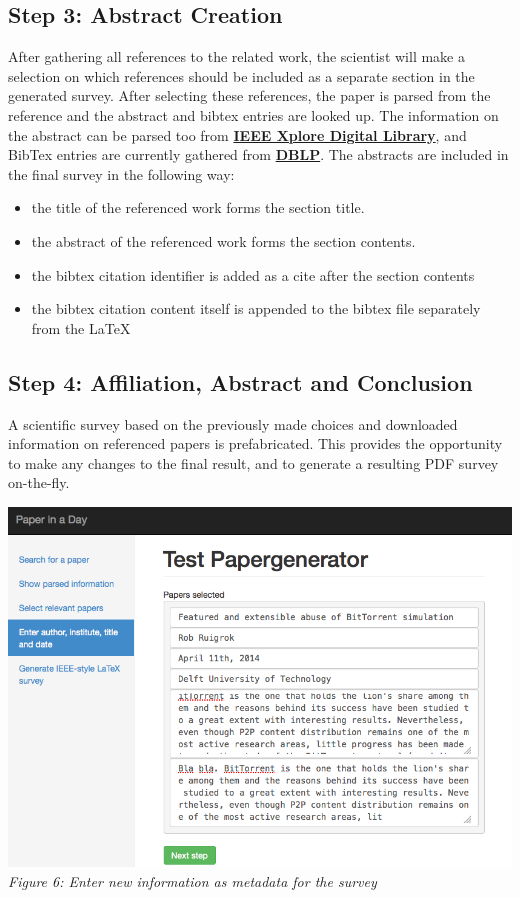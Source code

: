 \documentclass[12pt]{article}
\begin{document}
\subsection{Step 3: Abstract Creation}
After gathering all references to the related work, the scientist will make a selection on which references should be included as a separate section in the generated survey. After selecting these references, the paper is parsed from the reference and the abstract and bibtex entries are looked up. The information on the abstract can be parsed too from \textbf{\href{http://ieeexplore.ieee.org/Xplore/home.jsp}{IEEE Xplore Digital Library}}, and BibTex entries are currently gathered from \textbf{\href{http://dblp.uni-trier.de/db/}{DBLP}}. The abstracts are included in the final survey in the following way:
\begin{itemize}
\item the title of the referenced work forms the section title.
\item the abstract of the referenced work forms the section contents.
\item the bibtex citation identifier is added as a cite after the section contents
\item the bibtex citation content itself is appended to the bibtex file separately from the LaTeX
\end{itemize}

\subsection{Step 4: Affiliation, Abstract and Conclusion}
A scientific survey based on the previously made choices and downloaded information on referenced papers is prefabricated. This provides the opportunity to make any changes to the final result, and to generate a resulting PDF survey on-the-fly.


\includegraphics[width=17cm]{../screenshots/new-info.png}
\textit{\\Figure 6: Enter new information as metadata for the survey}\\\\
\end{document}
